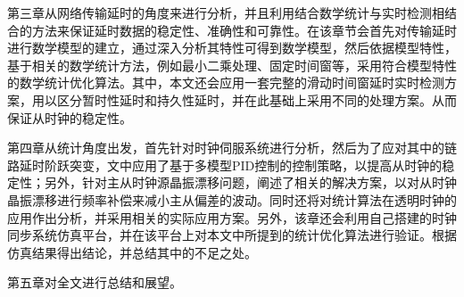 第三章从网络传输延时的角度来进行分析，并且利用结合数学统计与实时检测相结合的方法来保证延时数据的稳定性、准确性和可靠性。在该章节会首先对传输延时进行数学模型的建立，通过深入分析其特性可得到数学模型，然后依据模型特性，基于相关的数学统计方法，例如最小二乘处理、固定时间窗等，采用符合模型特性的数学统计优化算法。其中，本文还会应用一套完整的滑动时间窗延时实时检测方案，用以区分暂时性延时和持久性延时，并在此基础上采用不同的处理方案。从而保证从时钟的稳定性。

第四章从统计角度出发，首先针对时钟伺服系统进行分析，然后为了应对其中的链路延时阶跃突变，文中应用了基于多模型PID控制的控制策略，以提高从时钟的稳定性；另外，针对主从时钟源晶振漂移问题，阐述了相关的解决方案，以对从时钟晶振漂移进行频率补偿来减小主从偏差的波动。同时还将对统计算法在透明时钟的应用作出分析，并采用相关的实际应用方案。另外，该章还会利用自己搭建的时钟同步系统仿真平台，并在该平台上对本文中所提到的统计优化算法进行验证。根据仿真结果得出结论，并总结其中的不足之处。

第五章对全文进行总结和展望。
